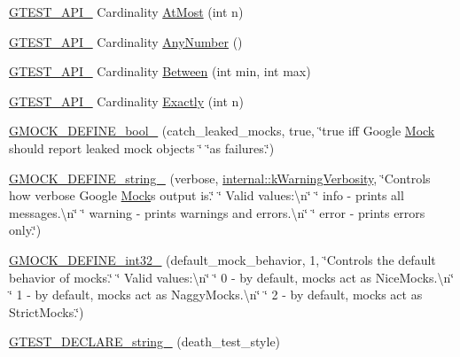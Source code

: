 \begin{DoxyCompactItemize}
\mbox{\hyperlink{gtest-port_8h_aa73be6f0ba4a7456180a94904ce17790}{G\+T\+E\+S\+T\+\_\+\+A\+P\+I\+\_\+}} Cardinality \mbox{\hyperlink{namespacetesting_a5487cd1068c78821ced96fbf542a91bb}{At\+Most}} (int n)
\item 
\mbox{\hyperlink{gtest-port_8h_aa73be6f0ba4a7456180a94904ce17790}{G\+T\+E\+S\+T\+\_\+\+A\+P\+I\+\_\+}} Cardinality \mbox{\hyperlink{namespacetesting_aa1f8a6371097e1e9b8d6866020f35252}{Any\+Number}} ()
\item 
\mbox{\hyperlink{gtest-port_8h_aa73be6f0ba4a7456180a94904ce17790}{G\+T\+E\+S\+T\+\_\+\+A\+P\+I\+\_\+}} Cardinality \mbox{\hyperlink{namespacetesting_a3bb2d3cdd3fdf5b4be1480fce549918e}{Between}} (int min, int max)
\item 
\mbox{\hyperlink{gtest-port_8h_aa73be6f0ba4a7456180a94904ce17790}{G\+T\+E\+S\+T\+\_\+\+A\+P\+I\+\_\+}} Cardinality \mbox{\hyperlink{namespacetesting_aa9b1b32ba9e8d3db8ac0af0fc8785c8d}{Exactly}} (int n)
\item 
\mbox{\hyperlink{namespacetesting_aca5af0e8943ba53352537ab84233b47f}{G\+M\+O\+C\+K\+\_\+\+D\+E\+F\+I\+N\+E\+\_\+bool\+\_\+}} (catch\+\_\+leaked\+\_\+mocks, true, \char`\"{}true iff Google \mbox{\hyperlink{classMock}{Mock}} should report leaked mock objects \char`\"{} \char`\"{}as failures.\char`\"{})
\item 
\mbox{\hyperlink{namespacetesting_a92ea84a47432512152022ef73176676f}{G\+M\+O\+C\+K\+\_\+\+D\+E\+F\+I\+N\+E\+\_\+string\+\_\+}} (verbose, \mbox{\hyperlink{namespacetesting_1_1internal_ad9386ccda6b6deac2f7b84784d3088c0}{internal\+::k\+Warning\+Verbosity}}, \char`\"{}Controls how verbose Google \mbox{\hyperlink{classMock}{Mock}}\textquotesingle{}s output is.\char`\"{} \char`\"{}  Valid values\+:\textbackslash{}n\char`\"{} \char`\"{}  info    -\/ prints all messages.\textbackslash{}n\char`\"{} \char`\"{}  warning -\/ prints warnings and errors.\textbackslash{}n\char`\"{} \char`\"{}  error   -\/ prints errors only.\char`\"{})
\item 
\mbox{\hyperlink{namespacetesting_a211b4be008f5b4cccee486a262d91a52}{G\+M\+O\+C\+K\+\_\+\+D\+E\+F\+I\+N\+E\+\_\+int32\+\_\+}} (default\+\_\+mock\+\_\+behavior, 1, \char`\"{}Controls the default behavior of mocks.\char`\"{} \char`\"{}  Valid values\+:\textbackslash{}n\char`\"{} \char`\"{}  0 -\/ by default, mocks act as Nice\+Mocks.\textbackslash{}n\char`\"{} \char`\"{}  1 -\/ by default, mocks act as Naggy\+Mocks.\textbackslash{}n\char`\"{} \char`\"{}  2 -\/ by default, mocks act as Strict\+Mocks.\char`\"{})
\item 
\mbox{\hyperlink{namespacetesting_a37b7e87f0a5f502c6918f37d1768c1f3}{G\+T\+E\+S\+T\+\_\+\+D\+E\+C\+L\+A\+R\+E\+\_\+string\+\_\+}} (death\+\_\+test\+\_\+style)

\end{DoxyCompactItemize}
